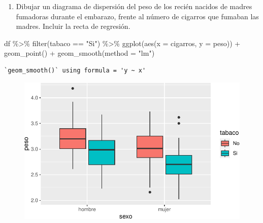 \documentclass[
  a4paper,
]{scrreport}
\newenvironment{Shaded}{\begin{snugshade}}{\end{snugshade}}
\newcommand{\AttributeTok}[1]{\textcolor[rgb]{0.40,0.45,0.13}{#1}}
\newcommand{\FunctionTok}[1]{\textcolor[rgb]{0.28,0.35,0.67}{#1}}
\newcommand{\NormalTok}[1]{\textcolor[rgb]{0.00,0.23,0.31}{#1}}
\newcommand{\SpecialCharTok}[1]{\textcolor[rgb]{0.37,0.37,0.37}{#1}}
\newcommand{\StringTok}[1]{\textcolor[rgb]{0.13,0.47,0.30}{#1}}
\providecommand{\tightlist}{%
  \setlength{\itemsep}{0pt}\setlength{\parskip}{0pt}}\usepackage{longtable,booktabs,array}
\theoremstyle{definition}
\theoremstyle{definition}
\theoremstyle{remark}
\begin{document}
\begin{enumerate}
\def\labelenumi{\alph{enumi}.}
\setcounter{enumi}{7}
\tightlist
\item
  Dibujar un diagrama de dispersión del peso de los recién nacidos de
  madres fumadoras durante el embarazo, frente al número de cigarros que
  fumaban las madres. Incluir la recta de regresión.
\end{enumerate}

\begin{tcolorbox}[enhanced jigsaw, opacitybacktitle=0.6, leftrule=.75mm, title=\textcolor{quarto-callout-note-color}{\faInfo}\hspace{0.5em}{Solución}, coltitle=black, rightrule=.15mm, colframe=quarto-callout-note-color-frame, left=2mm, opacityback=0, colbacktitle=quarto-callout-note-color!10!white, arc=.35mm, bottomtitle=1mm, toptitle=1mm, titlerule=0mm, breakable, bottomrule=.15mm, toprule=.15mm, colback=white]

\begin{Shaded}
\begin{Highlighting}[]
\NormalTok{df }\SpecialCharTok{\%\textgreater{}\%} 
    \FunctionTok{filter}\NormalTok{(tabaco }\SpecialCharTok{==} \StringTok{"Si"}\NormalTok{) }\SpecialCharTok{\%\textgreater{}\%}
    \FunctionTok{ggplot}\NormalTok{(}\FunctionTok{aes}\NormalTok{(}\AttributeTok{x =}\NormalTok{ cigarros, }\AttributeTok{y =}\NormalTok{ peso)) }\SpecialCharTok{+}
        \FunctionTok{geom\_point}\NormalTok{() }\SpecialCharTok{+}
        \FunctionTok{geom\_smooth}\NormalTok{(}\AttributeTok{method =} \StringTok{"lm"}\NormalTok{)}
\end{Highlighting}
\end{Shaded}

\begin{verbatim}
`geom_smooth()` using formula = 'y ~ x'
\end{verbatim}

\begin{figure}[H]

{\centering \includegraphics{./07-graficos_files/figure-pdf/unnamed-chunk-39-1.pdf}

}

\end{figure}

\end{tcolorbox}
\end{document}
